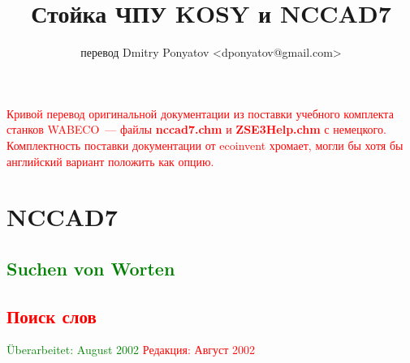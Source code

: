 \documentclass[14pt,a4paper]{book}
\title{Стойка ЧПУ KOSY и NCCAD7}
\author{перевод Dmitry Ponyatov <dponyatov@gmail.com>}
\newcommand{\DE}[1]{\textcolor{green}{#1}}
\newcommand{\RU}[1]{\textcolor{red}{#1}}
\newcommand{\file}[1]{\textbf{#1}}
\begin{document}
\maketitle

\RU{Кривой перевод оригинальной документации из поставки учебного комплекта станков
WABECO~--- файлы \file{nccad7.chm} и \file{ZSE3Help.chm} с немецкого.
Комплектность поставки документации от ecoinvent хромает, могли бы хотя бы
английский вариант положить как опцию.}

\tableofcontents

\part{NCCAD7}


\DE{\chapter{Suchen von Worten}}
\RU{\chapter{Поиск слов}}

\DE{Überarbeitet: August 2002}
\RU{Редакция: Август 2002}

\bigskip 
\end{document}
